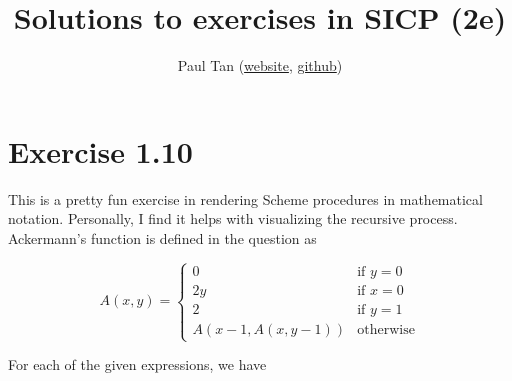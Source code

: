 \documentclass{report}
\title{Solutions to exercises in SICP (2e)}
\author{Paul Tan (\href{http://pauljxtan.com}{website}, \href{https://github.com/pauljxtan}{github})}
\begin{document}
\maketitle
\tableofcontents

\chapter{Exercise 1.10}

This is a pretty fun exercise in rendering Scheme procedures in mathematical notation. Personally, I find it helps with visualizing the recursive process. \\

Ackermann's function is defined in the question as

\begin{equation}
  A(x, y) = \begin{cases}
    0 & \text{if } y = 0 \\
    2y & \text{if } x = 0 \\
    2 & \text{if } y = 1 \\
    A(x - 1, A(x, y - 1)) & \text{otherwise}
  \end{cases}
\end{equation}

For each of the given expressions, we have
\end{document}

